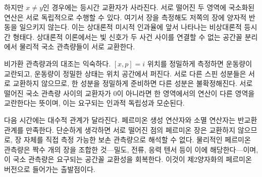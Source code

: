 \begin{classroomqa}
\end{classroomqa}

하지만 \(x\neq y\)인 경우에는 등시간 교환자가 사라진다. 서로 떨어진 두 영역에 국소화된 연산은 서로 독립적으로 수행할 수 있다. 여기서 장을 측정해도 저쪽의 장에 양자적 반동을 일으키지 않는다. 이는 상대론적 미시적 인과율에 앞서 나타나는 비상대론적 등시간 형태다. 상대론적 이론에서는 빛 신호가 두 사건 사이를 연결할 수 없는 공간꼴 분리에서 물리적 국소 관측량들이 서로 교환한다.

비가환 관측량과의 대조는 익숙하다. \([x,p]=i\) 위치를 정밀하게 측정하면 운동량이 교란되고, 운동량이 정밀한 상태는 위치 공간에서 퍼진다. 서로 다른 스핀 성분들은 서로 교환하지 않으므로, 한 성분을 정밀하게 준비하면 다른 성분은 불확정해진다. 서로 떨어진 국소 관측량 사이의 교환자가 0이 아니라면 한 영역에서의 연산이 다른 영역을 교란한다는 뜻이며, 이는 요구되는 인과적 독립성과 모순된다.

\begin{classroomqa}
\end{classroomqa}

다음 시간에는 대수적 관계가 달라진다. 페르미온 생성 연산자와 소멸 연산자는 반교환 관계를 만족한다. 단순하게 생각하면 서로 떨어진 점의 페르미온 장은 교환하지 않으므로, 장 자체를 직접 측정 가능한 보손 관측량으로 해석할 수 없다. 물리적인 페르미온 관측량은 짝수 개의 장을 조합한 것---밀도, 전류, 응력 텐서 등이 이에 해당한다---이며, 이 국소 관측량은 요구되는 공간꼴 교환성을 회복한다. 이것이 제2양자화의 페르미온 버전으로 들어가는 출발점이다.
